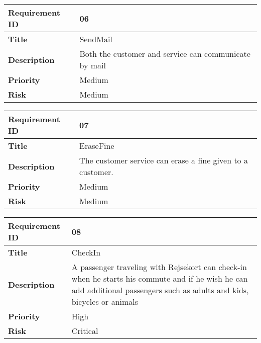 \begin{center}
	\def\arraystretch{1.5}%
    \begin{tabular}{ | p{5cm} | p{5cm} |}
    \hline
    	\textbf{Requirement ID} & 06 \\ \hline
		\textbf{Title} & SendMail\\ \hline
		\textbf{Description} & Both the customer and service can communicate by mail\\ \hline
		\textbf{Priority} & Medium\\ \hline
		\textbf{Risk} & Medium\\
      \hline
    \end{tabular}
\end{center}

\begin{center}
	\def\arraystretch{1.5}%
    \begin{tabular}{ | p{5cm} | p{5cm} |}
    \hline
    	\textbf{Requirement ID} & 07 \\ \hline
		\textbf{Title} & EraseFine\\ \hline
		\textbf{Description} & The customer service can erase a fine given to a customer.\\ \hline
		\textbf{Priority} & Medium\\ \hline
		\textbf{Risk} & Medium\\
      \hline
    \end{tabular}
\end{center}

\begin{center}
	\def\arraystretch{1.5}%
    \begin{tabular}{ | p{5cm} | p{5cm} |}
    \hline
    	\textbf{Requirement ID} & 08 \\ \hline
		\textbf{Title} & CheckIn\\ \hline
		\textbf{Description} & A passenger traveling with Rejsekort can check-in when he starts his commute and if he wish he can add additional passengers such as adults and kids, bicycles or animals\\ \hline
		\textbf{Priority} & High\\ \hline
		\textbf{Risk} & Critical\\
      \hline
    \end{tabular}
\end{center}

